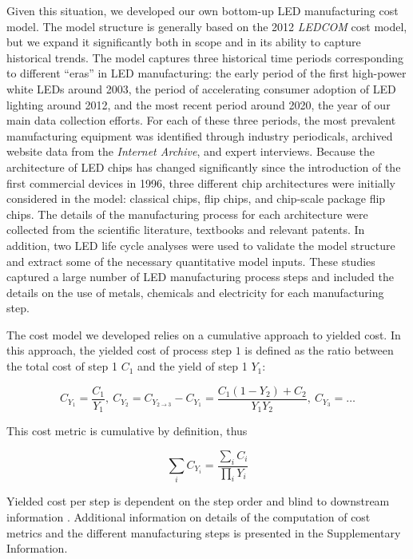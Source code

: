 \documentclass[twoside,twocolumn,9pt]{article}
\begin{document}
Given this situation, we developed our own bottom-up LED manufacturing cost model. The model structure is generally based on the 2012 \textit{LEDCOM} cost model, but we expand it significantly both in scope and in its ability to capture historical trends. The model captures three historical time periods corresponding to different “eras” in LED manufacturing: the early period of the first high-power white LEDs around 2003, the period of accelerating consumer adoption of LED lighting around 2012, and the most recent period around 2020, the year of our main data collection efforts. For each of these three periods, the most prevalent manufacturing equipment was identified through industry periodicals, archived website data from the \textit{Internet Archive}, and expert interviews. Because the architecture of LED chips has changed significantly since the introduction of the first commercial devices in 1996, three different chip architectures were initially considered in the model: classical chips, flip chips, and chip-scale package flip chips. The details of the manufacturing process for each architecture were collected from the scientific literature, textbooks and relevant patents. In addition, two LED life cycle analyses \cite{scholand2012life}\cite{casamayor2018comparative} were used to validate the model structure and extract some of the necessary quantitative model inputs. These studies captured a large number of LED manufacturing process steps and included the details on the use of metals, chemicals and electricity for each manufacturing step.

The cost model we developed relies on a cumulative approach to yielded cost\cite{becker2001use}. In this approach, the yielded cost of process step $1$ is defined as the ratio between the total cost of step 1 $C_1$ and the yield of step 1 $Y_1$:

\begin{equation}
    C_{Y_1} = \frac{C_1}{Y_1}, \ C_{Y_2} = C_{Y_{2 \rightarrow 3}} - C_{Y_1} = \frac{C_1(1-Y_2)+C_2}{Y_1Y_2}, \ C_{Y_3}=\dots
\end{equation}

This cost metric is cumulative by definition, thus

\begin{equation}
    \sum_i C_{Y_i} = \frac{\sum_i C_i}{\prod_i Y_i}
\end{equation}

Yielded cost per step is dependent on the step order and blind to downstream information \cite{becker2001use}. Additional information on details of the computation of cost metrics and the different manufacturing steps is presented in the Supplementary Information.
\end{document}
